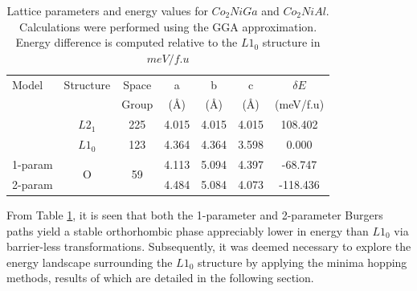 \documentclass[%
preprint,
 amsmath,amssymb,
 aps,
prb,
showkeys,
]{revtex4-1}
\begin{document}
\begin{table}[ht]
\caption{Lattice parameters and energy values for  $Co_2NiGa$ and $Co_2NiAl$. Calculations were performed using the  GGA \cite{Perdew1992} approximation. Energy difference is computed relative to the  $L1_0$ structure in $meV/f.u$}
\setlength{\tabcolsep}{0.56cm}
\begin{tabular}{lcccccc}
\hline \hline
Model  & Structure          & Space               & a                         & b                         & c                         & $\delta E$ \\
        &                    & Group               & (\AA)                       & (\AA)                       & (\AA)                       & (meV/f.u)  \\ \hline 
        & $L2_1$             & 225                 & 4.015                     & 4.015                     & 4.015                     & 108.402    \\
        & $L1_0$             & 123                 & 4.364                     & 4.364                     & 3.598                     & 0.000      \\
1-param & \multirow{2}{*}{O} & \multirow{2}{*}{59} & 4.113                     & 5.094                     & 4.397                     & -68.747    \\
2-param &                    &                     & \multicolumn{1}{l}{4.484} & \multicolumn{1}{l}{5.084} & \multicolumn{1}{l}{4.073} &  -118.436  \\
\hline
\end{tabular}
\label{tab:CoNiGa_energy}
\end{table}


From Table \ref{tab:CoNiGa_energy}, it is seen that both the 1-parameter and 2-parameter Burgers paths yield a stable orthorhombic phase appreciably lower in energy than $L1_0$ via barrier-less transformations. 
Subsequently, it was deemed necessary to explore the energy landscape surrounding the $L1_0$ structure by applying the minima hopping methods, results of which are detailed in the following section.
\end{document}
